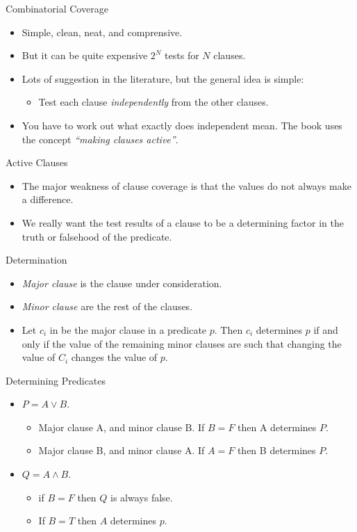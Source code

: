 \documentclass{beamer}
\begin{document}
\begin{frame}{Combinatorial Coverage}
  \begin{itemize}
    \item Simple, clean, neat, and comprensive.
  \item But it can be quite expensive $2^N$ tests for $N$ clauses. 
  \item Lots of suggestion in the literature, but the general idea is
    simple:
    \begin{itemize}
    \item Test each clause {\em independently} from the other clauses.
    \end{itemize}
  \item You have to work out what exactly does independent mean. The
    book uses the concept {\em ``making clauses active''}.
  \end{itemize}
\end{frame}
\begin{frame}{Active Clauses}
  \begin{itemize}
  \item The major weakness of clause coverage is that the values do
    not always make a difference.
  \item We really want the test results of a clause to be a
    determining factor in the truth or falsehood of the predicate.
  \end{itemize}
  
\end{frame}
\begin{frame}{Determination}
  \begin{itemize}
  \item {\em Major clause}  is the clause under consideration.
  \item {\em Minor clause}  are the rest of the clauses.
  \item Let $c_i$ in  be the major clause in a predicate $p$. Then
    $c_i$ determines $p$ if and only if the value of the remaining
    minor clauses are such that changing the value of $C_i$ changes
    the value of $p$. 
  \end{itemize}
  
\end{frame}
\begin{frame}{Determining Predicates}

  \begin{itemize}
  \item $P = A \lor B$.
    \begin{itemize}
    \item Major clause A, and minor clause B. If $B=F$ then A determines $P$. 
    \item Major clause B, and minor clause A. If $A=F$ then B determines $P$.
    \end{itemize}
  \item $Q = A \land B$.
    \begin{itemize}
    \item if $B=F$ then $Q$ is always false. 
    \item If $B=T$ then $A$ determines $p$.
    \end{itemize}
  \end{itemize}
  \end{frame}
\end{document}
